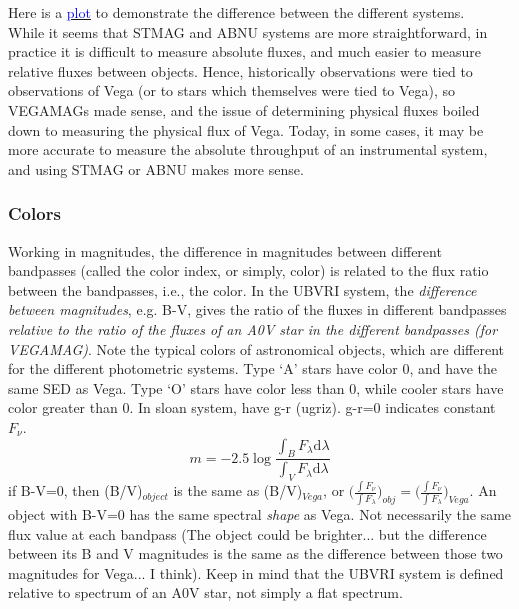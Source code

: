 \documentclass[12pt]{article}
\begin{document}
\noindent Here is a
\href{http://astronomy.nmsu.edu/holtz/a535/html/diagrams/a535/mag.htm}
{\textcolor{blue}{plot}}
to demonstrate the difference between the different systems.\\

\noindent While it seems that STMAG and ABNU systems are more
straightforward, in practice it is difficult to measure absolute
fluxes, and much easier to measure relative fluxes between objects.
Hence, historically observations were tied to observations of Vega (or
to stars which themselves were tied to Vega), so VEGAMAGs made sense,
and the issue of determining physical fluxes boiled down to measuring
the physical flux of Vega. Today, in some cases, it may be more
accurate to measure the absolute throughput of an instrumental system,
and using STMAG or ABNU makes more sense.

\subsubsection*{Colors}
Working in magnitudes, the difference in magnitudes between different
bandpasses (called the color index, or simply, color) is related to
the flux ratio between the bandpasses, i.e., the color.
In the UBVRI
system, the \emph{difference between magnitudes}, e.g. B-V,
gives the ratio of the fluxes in different bandpasses
\emph{relative to the ratio of the fluxes of
an A0V star in the different bandpasses (for VEGAMAG)}.
Note the typical colors of astronomical objects,
which are different for the different photometric systems.
Type `A' stars have color 0, and have the same SED as Vega.
Type `O' stars have color less than 0,
while cooler stars have color greater than 0.
In sloan system, have  g-r (ugriz). g-r=0 indicates constant
$F_{\nu}$.
\begin{equation*}
    m = -2.5\log\frac{\int_B F_{\lambda}\textrm{d}\lambda}
    {\int_V F_{\lambda}\textrm{d}\lambda}
\end{equation*}
if B-V=0, then (B/V)$_{object}$ is the same as (B/V)$_{Vega}$,
or $\Big(\frac{\int F_{\nu}}{\int F_{\lambda}}\Big)_{obj} =
    \Big(\frac{\int F_{\nu}}{\int F_{\lambda}}\Big)_{Vega} $.
An object with B-V=0 has the same spectral \emph{shape} as Vega.
Not necessarily the same flux value at each bandpass
(The object could be brighter... but the difference between its B and
V magnitudes is the same as the difference between those two
magnitudes for Vega... I think).
Keep in mind that the UBVRI system is defined relative to spectrum of
an A0V star, not simply a flat spectrum.
\end{document}
